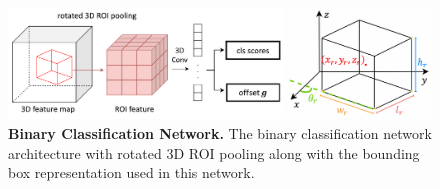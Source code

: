 \begin{figure}[t]
    \includegraphics[width=1\linewidth]{figs/objectness.pdf}
    \vspace{-0.25in}
    \caption{\textbf{Binary Classification Network.} The binary classification network architecture with rotated 3D ROI pooling along with the bounding box representation used in this network. }
    \vspace{-0.2in}
    \label{fig:obj}
\end{figure}
